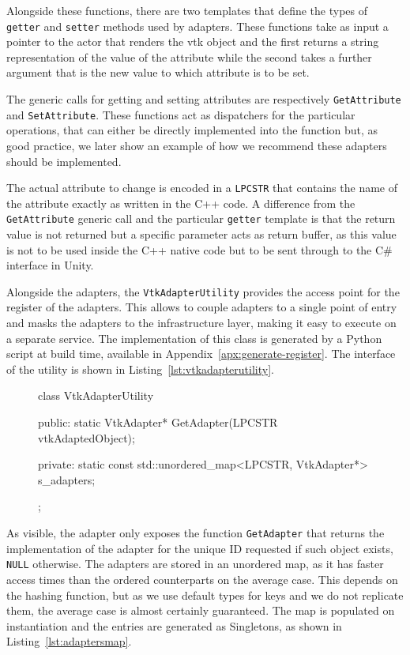 Alongside these functions, there are two templates that define the types of \verb|getter| and \verb|setter| methods used by adapters. These functions take as input a pointer to the actor that renders the \acrshort{vtk} object and the first returns a string representation of the value of the attribute while the second takes a further argument that is the new value to which attribute is to be set.

The generic calls for getting and setting attributes are respectively \verb|GetAttribute| and \verb|SetAttribute|. These functions act as dispatchers for the particular operations, that can either be directly implemented into the function but, as good practice, we later show an example of how we recommend these adapters should be implemented.

The actual attribute to change is encoded in a \verb|LPCSTR| that contains the name of the attribute exactly as written in the C++ code. A difference from the \verb|GetAttribute| generic call and the particular \verb|getter| template is that the return value is not returned but a specific parameter acts as return buffer, as this value is not to be used inside the C++ native code but to be sent through to the C\# interface in Unity.

Alongside the adapters, the \verb|VtkAdapterUtility| provides the access point for the register of the adapters. This allows to couple adapters to a single point of entry and masks the adapters to the infrastructure layer, making it easy to execute on a separate service. The implementation of this class is generated by a Python script at build time, available in Appendix~\ref{apx:generate-register}. The interface of the utility is shown in Listing~\ref{lst:vtkadapterutility}.

\begin{figure}
    \centering
    \begin{cpp}[label=lst:vtkadapterutility,caption={VtkAdapterUtility interface}]
class VtkAdapterUtility
{
public:
	static VtkAdapter* GetAdapter(LPCSTR vtkAdaptedObject);

private:
	static const std::unordered_map<LPCSTR, VtkAdapter*> s_adapters;
};
    \end{cpp}
\end{figure}

As visible, the adapter only exposes the function \verb|GetAdapter| that returns the implementation of the adapter for the unique ID requested if such object exists, \verb|NULL| otherwise. The adapters are stored in an unordered map, as it has faster access times than the ordered counterparts \cite{stdunord16, stdmapcp55} on the average case. This depends on the hashing function, but as we use default types for keys and we do not replicate them, the average case is almost certainly guaranteed. The map is populated on instantiation and the entries are generated as Singletons, as shown in Listing~\ref{lst:adaptersmap}.

